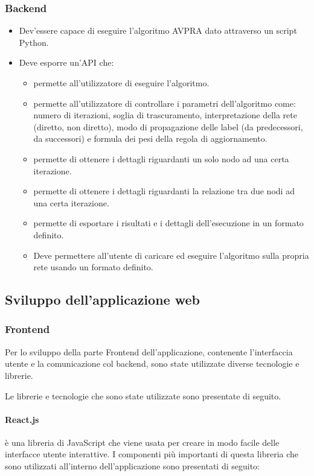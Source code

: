 \documentclass[a4paper,12pt]{report}
\begin{document}
			\subsubsection{Backend}
			\begin{itemize}
				\item Dev'essere capace di eseguire l'algoritmo AVPRA dato attraverso un script Python.
				\item Deve esporre un'API che:
				\begin{itemize}
					\item permette all'utilizzatore di eseguire l'algoritmo.
					\item permette all'utilizzatore di controllare i parametri dell'algoritmo come: numero di iterazioni, soglia di trascuramento, interpretazione della rete (diretto, non diretto), modo di propagazione delle label (da predecessori, da successori) e formula dei pesi della regola di aggiornamento.
					\item permette di ottenere i dettagli riguardanti un solo nodo ad una certa iterazione.
					\item permette di ottenere i dettagli riguardanti la relazione tra due nodi ad una certa iterazione.
					\item permette di esportare i risultati e i dettagli dell'esecuzione in un formato definito.
					\item Deve permettere all'utente di caricare ed eseguire l'algoritmo sulla propria rete usando un formato definito.
				\end{itemize}
			\end{itemize}

		\subsection{Sviluppo dell'applicazione web}

			\subsubsection{Frontend}
			Per lo sviluppo della parte Frontend dell'applicazione, contenente l'interfaccia utente e la comunicazione col backend, sono state utilizzate diverse tecnologie e librerie. 
			
			Le librerie e tecnologie che sono state utilizzate sono presentate di seguito.

			\paragraph*{React.js} \par è una libreria di JavaScript che viene usata per creare in modo facile delle interfacce utente interattive. 
				I componenti più importanti di questa libreria che sono utilizzati all'interno dell'applicazione sono presentati di seguito:
				
\end{document}
